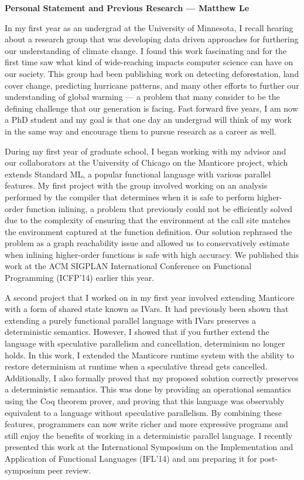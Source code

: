 \documentclass[12pt]{article}
\begin{document}
\centerline{\bf Personal Statement and Previous Research --- Matthew Le} 


In my first year as an undergrad at the University of Minnesota, I recall hearing about a research group that was developing data driven approaches for furthering our understanding of climate change. I found this work fascinating and for the first time saw what kind of wide-reaching impacts computer science can have on our society. This group had been publishing work on detecting deforestation, land cover change, predicting hurricane patterns, and many other efforts to further our understanding of global warming --- a problem that many consider to be the defining challenge that our generation is facing. Fast forward five years, I am now a PhD student and my goal is that one day an undergrad will think of my work in the same way and encourage them to pursue research as a career as well.

During my first year of graduate school, I began working with my advisor and our collaborators at the University of Chicago on the Manticore project, which extends Standard ML, a popular functional language with various parallel features.  My first project with the group involved working on an analysis performed by the compiler that determines when it is safe to perform higher-order function inlining, a problem that previously could not be efficiently solved due to the complexity of ensuring that the environment at the call site matches the environment captured at the function definition.  Our solution rephrased the problem as a graph reachability issue and allowed us to conservatively estimate when inlining higher-order functions is safe with high accuracy.  We published this work at the ACM SIGPLAN International Conference on Functional Programming (ICFP'14) earlier this year.  

A second project that I worked on in my first year involved extending Manticore with a form of shared state known as IVars.  It had previously been shown that extending a purely functional parallel language with IVars preserves a deterministic semantics.  However, I showed that if you further extend the language with speculative parallelism and cancellation, determinism no longer holds.  In this work, I extended the Manticore runtime system with the ability to restore determinism at runtime when a speculative thread gets cancelled.  Additionally, I also formally proved that my proposed solution correctly preserves a deterministic semantics.  This was done by providing an operational semantics using the Coq theorem prover, and proving that this language was observably equivalent to a language without speculative parallelism.  By combining these features, programmers can now write richer and more expressive programs and still enjoy the benefits of working in a deterministic parallel language.  I recently presented this work at the International Symposium on the Implementation and Application of Functional Languages (IFL'14) and am preparing it for post-symposium peer review.  
\end{document}
